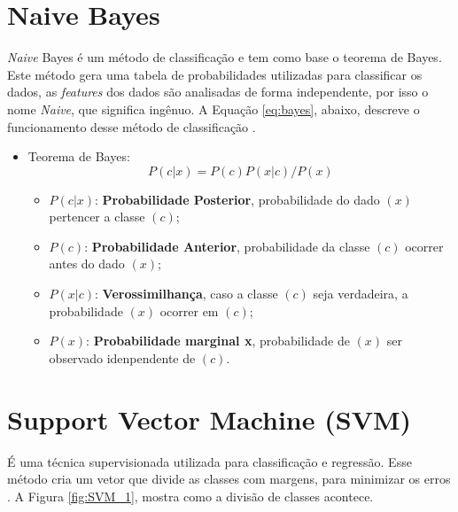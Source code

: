 \section{Naive Bayes}

\textit{Naive} Bayes é um método de classificação e tem como base o teorema de Bayes. Este método
gera uma tabela de probabilidades utilizadas para classificar os dados, as \textit{features} dos 
dados são analisadas de forma independente, por isso o nome \textit{Naive}, que significa
ingênuo. A Equação \ref{eq:bayes}, abaixo, descreve o funcionamento desse método de classificação \cite{BattaMahesh2018}.

\begin{itemize}
    \item Teorema de Bayes:
    \begin{equation}
        P(c|x) = P(c)P(x|c)/P(x)
        \label{eq:bayes}
    \end{equation}

    \begin{itemize}
        \item $P(c|x)$: \textbf{Probabilidade Posterior}, probabilidade do dado $(x)$ pertencer a classe $(c)$;
        \item $P(c)$: \textbf{Probabilidade Anterior}, probabilidade da classe $(c)$ ocorrer antes do dado $(x)$;
        \item $P(x|c)$: \textbf{Verossimilhança}, caso a classe $(c)$ seja verdadeira, a probabilidade $(x)$ ocorrer em $(c)$;
        \item $P(x)$: \textbf{Probabilidade marginal x}, probabilidade de $(x)$ ser observado idenpendente de $(c)$.
    \end{itemize}
\end{itemize}




\section{Support Vector Machine (SVM)}

É uma técnica supervisionada utilizada para classificação e regressão. Esse método cria um vetor que divide as classes
com margens, para minimizar os erros \cite{BattaMahesh2018}. A Figura \ref{fig:SVM_1}, mostra como a divisão de classes
acontece.


